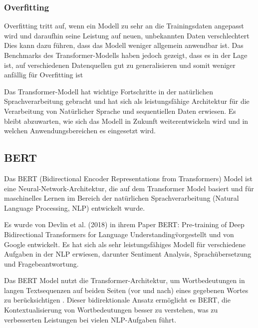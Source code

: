 \documentclass[oneside,bibliography=totocnumbered,BCOR=5mm]{scrbook}%
\theoremstyle{definition}
\theoremstyle{definition}
\theoremstyle{definition}
\theoremstyle{definition}
\theoremstyle{definition}
\theoremstyle{definition}
\begin{document}
\subsubsection{Overfitting}

Overfitting tritt auf, wenn ein Modell zu sehr an die Trainingsdaten angepasst wird und daraufhin seine Leistung auf neuen, 
unbekannten Daten verschlechtert \autocite[Seite 81]{MLgood2know}
Dies kann dazu führen, dass das Modell weniger allgemein anwendbar ist. 
Das Benchmarks des Transformer-Modells haben jedoch gezeigt, dass es in der Lage ist, auf verschiedenen Datenquellen gut zu generalisieren 
und somit weniger anfällig für Overfitting ist \autocite[Seite 9]{transformer}


Das Transformer-Modell hat wichtige Fortschritte in der natürlichen Sprachverarbeitung gebracht 
und hat sich als leistungsfähige Architektur für die Verarbeitung von Natürlicher Sprache und sequentiellen Daten erwiesen. 
Es bleibt abzuwarten, wie sich das Modell in Zukunft weiterentwickeln wird und in welchen Anwendungsbereichen es eingesetzt wird.


\subsection{BERT}


Das BERT (Bidirectional Encoder Representations from Transformers) Model ist eine Neural-Network-Architektur, 
die auf dem Transformer Model basiert und für maschinelles Lernen im Bereich der natürlichen 
Sprachverarbeitung (Natural Language Processing, NLP) entwickelt wurde. 


Es wurde von Devlin et al. (2018) in ihrem Paper \"BERT: Pre-training of Deep Bidirectional Transformers for 
Language Understanding\" vorgestellt und von Google entwickelt. 
Es hat sich als sehr leistungsfähiges Modell für verschiedene Aufgaben in der NLP erwiesen, 
darunter Sentiment Analysis, Sprachübersetzung und Fragebeantwortung.


Das BERT Model nutzt die Transformer-Architektur, um Wortbedeutungen in langen Textsequenzen auf 
beiden Seiten (vor und nach) eines gegebenen Wortes zu berücksichtigen \autocite[Seite 5]{bert}. 
Dieser bidirektionale Ansatz ermöglicht es BERT, die Kontextualisierung von Wortbedeutungen besser zu verstehen, 
was zu verbesserten Leistungen bei vielen NLP-Aufgaben führt.
\end{document}
